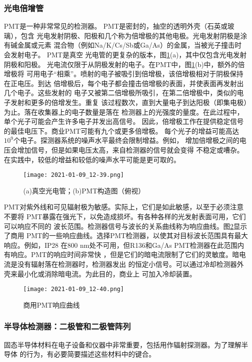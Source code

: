 \subsubsection{光电倍增管}
PMT是一种非常常见的检测器。 PMT是密封的，抽空的透明外壳（石英或玻璃），包含
光电发射阴极、阳极和几个称为倍增极的其他电极。光电发射阴极是涂有碱金属或元素
混合物（例如Na/K/Cs/Sb或Ga/As）的金属，当被光子撞击时会发射电子。 PMT是真空
光电管的更复杂的版本，图\ref{fig:5.18}(a)，其中仅包含光电发射阴极和阳极。
光电流仅限于从阴极发射的电子。在PMT中，图\ref{fig:5.18}(b)中，额外的倍增极将
可用电子“相乘”。喷射的电子被吸引到倍增极，该倍增极相对于阴极保持在正电压。到达
倍增极后，每个电子都会撞击倍增极的表面，并使表面再发射出几个电子。这些发射的
电子又被第二倍增极所吸引，在第二倍增极中，类似的电子发射和更多的倍增发生。重复
该过程数次，直到大量电子到达阳极（即集电极）为止。落在收集器上的电子数量是落在
检测器上的光强度的量度。在此过程中，单个光子可能会产生许多电子并发出高信号。
因此，倍增极工作在提供稳定信号的最佳电压下。商业PMT可能有九个或更多倍增极。
每个光子的增益可能高达$10^9$个电子。探测器系统的噪声水平最终会限制增益。例如，
增加倍增极之间的电压会增加信号，但是如果电压太高，来自检测器的信号就会变得
不稳定或嘈杂。在实践中，较低的增益和较低的噪声水平可能是更可取的。
\begin{figure}[htpb]
    \centering
    \texttt{[image: 2021-01-09\_12-39.png]}
    \caption{(a)真空光电管；(b)PMT构造图（俯视）}
    \label{fig:5.18}
\end{figure}

PMT对紫外线和可见辐射极为敏感。实际上，它们是如此敏感，以至于必须注意不要将
PMT暴露在强光下，以免造成损坏。有各种各样的光发射表面可用，它们可以响应不同的
波长范围。检测器信号与波长的关系曲线称为响应曲线。图\ref{fig:5.19}显示了商用
PMT的一些响应曲线。选择PMT检测器，以使其对目标波长范围具有最大响应。例如，IP28
在800 nm处不可用，但R136和Ga/As PMT检测器在此范围内有响应。PMT的响应时间非常快
，但是它们的暗电流限制了它们的灵敏度。暗电流是没有辐射落在检测器时，检测器发出
的恒定小信号。可以通过冷却检测器外壳来最小化或消除暗电流。为此目的，商业上
可加入冷却装置。
\begin{figure}[htpb]
    \centering
    \texttt{[image: 2021-01-09\_12-40.png]}
    \caption{商用PMT响应曲线}
    \label{fig:5.19}
\end{figure}
\subsubsection{半导体检测器：二极管和二极管阵列}
固态半导体材料在电子设备和仪器中非常重要，包括用作辐射探测器。为了理解半导体
的行为，有必要简要描述这些材料中的键合。

